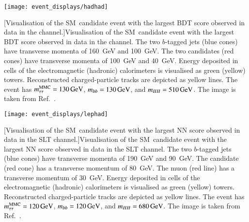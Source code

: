{
  \centering

  \vspace*{0.2em}

  \texttt{[image: event\_displays/hadhad]}

  [Visualisation of the SM~\HH candidate event with the
  largest BDT score observed in data in the \hadhad channel.]{Visualisation of
    the SM~\HH candidate event with the largest BDT score observed in data in
    the \hadhad channel. The two $b$-tagged jets (blue cones) have transverse
    momenta of \SI{160}{\GeV} and \SI{100}{\GeV}. The two \tauhadvis candidates
    (red cones) have transverse momenta of \SI{100}{\GeV} and
    \SI{40}{\GeV}. Energy deposited in cells of the electromagnetic (hadronic)
    calorimeters is visualised as green (yellow) towers. Reconstructed
    charged-particle tracks are depicted as yellow lines. The event has
    $m_{\tau\tau}^\text{MMC} = \SI{130}{\ensuremath{\text{GeV}}}$, $\mBB = \SI{130}{\GeV}$, and
    $m_{HH} = \SI{510}{\ensuremath{\text{GeV}}}$. The image is taken from Ref.~\cite{HDBS-2018-40}.}%
  \label{fig:event_display_hadhad}
}

{
  \centering

  \null\vfill

  \texttt{[image: event\_displays/lephad]}

  [Visualisation of the SM~\HH candidate event with the
  largest NN score observed in data in the \lephad SLT channel.]{Visualisation
    of the SM~\HH candidate event with the largest NN score observed in data in
    the \lephad SLT channel. The two $b$-tagged jets (blue cones) have
    transverse momenta of \SI{190}{\GeV} and \SI{90}{\GeV}. The \tauhadvis
    candidate (red cone) has a transverse momentum of \SI{80}{\GeV}. The muon
    (red line) has a transverse momentum of \SI{30}{\GeV}. Energy deposited in
    cells of the electromagnetic (hadronic) calorimeters is visualised as green
    (yellow) towers. Reconstructed charged-particle tracks are depicted as
    yellow lines. The event has $m_{\tau\tau}^\text{MMC} = \SI{120}{\ensuremath{\text{GeV}}}$,
    $\mBB = \SI{120}{\GeV}$, and $m_{HH} = \SI{680}{\ensuremath{\text{GeV}}}$. The image is taken
    from Ref.~\cite{HDBS-2018-40}.}%
  \label{fig:event_display_lephad}

  \null\vfill
}

